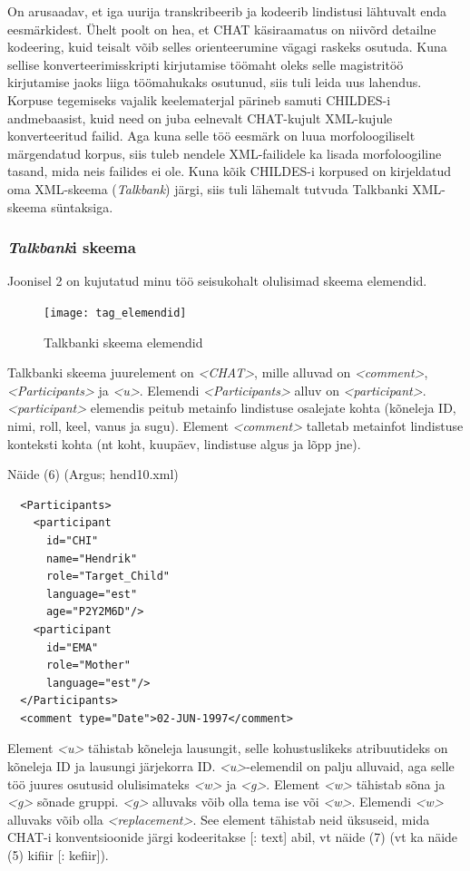 \documentclass[12pt]{article}
\begin{document}
\hfill

On arusaadav, et iga uurija transkribeerib ja kodeerib lindistusi lähtuvalt enda eesmärkidest. Ühelt poolt on hea, et CHAT käsiraamatus on niivõrd detailne kodeering, kuid teisalt võib selles orienteerumine vägagi raskeks osutuda. Kuna sellise konverteerimisskripti kirjutamise töömaht oleks selle magistritöö kirjutamise jaoks liiga töömahukaks osutunud, siis tuli leida uus lahendus. Korpuse tegemiseks vajalik keelematerjal pärineb samuti CHILDES-i andmebaasist, kuid need on juba eelnevalt CHAT-kujult XML-kujule konverteeritud failid. Aga kuna selle töö eesmärk on luua morfoloogiliselt märgendatud korpus, siis tuleb nendele XML-failidele ka lisada morfoloogiline tasand, mida neis failides ei ole. Kuna kõik CHILDES-i korpused on kirjeldatud oma XML-skeema (\emph{Talkbank}) järgi, siis tuli lähemalt tutvuda Talkbanki XML-skeema süntaksiga.

\subsubsection{\emph{Talkbank}i skeema}

Joonisel 2 on kujutatud minu töö seisukohalt olulisimad skeema elemendid.

\begin{figure}[H]
    \centering
    \texttt{[image: tag\_elemendid]}
    \caption{Talkbanki skeema elemendid}
\end{figure}

Talkbanki skeema juurelement on \emph{<CHAT>}, mille alluvad on \emph{<comment>}, \emph{<Participants>} ja \emph{<u>}. Elemendi \emph{<Participants>} alluv on \emph{<participant>}. \emph{<participant>} elemendis peitub metainfo lindistuse osalejate kohta (kõneleja ID, nimi, roll, keel, vanus ja sugu). Element \emph{<comment>} talletab metainfot lindistuse konteksti kohta (nt koht, kuupäev, lindistuse algus ja lõpp jne).

Näide (6) (Argus; hend10.xml)
\begin{lstlisting}
  <Participants>
    <participant
      id="CHI"
      name="Hendrik"
      role="Target_Child"
      language="est"
      age="P2Y2M6D"/>
    <participant
      id="EMA"
      role="Mother"
      language="est"/>
  </Participants>
  <comment type="Date">02-JUN-1997</comment>
\end{lstlisting}

Element \emph{<u>} tähistab kõneleja lausungit, selle kohustuslikeks atribuutideks on kõneleja ID ja lausungi järjekorra ID. \emph{<u>}-elemendil on palju alluvaid, aga selle töö juures osutusid olulisimateks \emph{<w>} ja \emph{<g>}. Element \emph{<w>} tähistab sõna ja \emph{<g>} sõnade gruppi. \emph{<g>} alluvaks võib olla tema ise või \emph{<w>}. Elemendi \emph{<w>} alluvaks võib olla \emph{<replacement>}. See element tähistab neid üksuseid, mida CHAT-i konventsioonide järgi kodeeritakse [: text] abil, vt näide (7) (vt ka näide (5) kifiir [: kefiir]).
\end{document}
